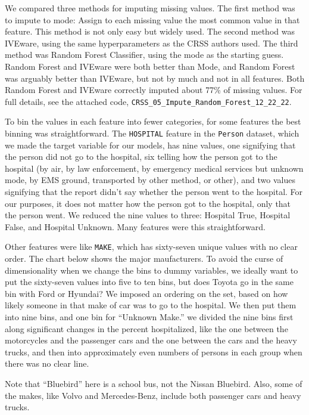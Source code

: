 We compared three methods for imputing missing values.  The first method was to impute to mode:  Assign to each missing value the most common value in that feature.  This method is not only easy but widely used.  The second method was IVEware, using the same hyperparameters as the CRSS authors used.  The third method was Random Forest Classifier, using the mode as the starting guess.  Random Forest and IVEware were both better than Mode, and Random Forest was arguably better than IVEware, but not by much and not in all features.  Both Random Forest and IVEware correctly imputed about 77\% of missing values.  For full details, see the attached code, 
\verb|CRSS_05_Impute_Random_Forest_12_22_22|.

To bin the values in each feature into fewer categories, for some features the best binning was straightforward.  The \verb|HOSPITAL| feature in the \verb|Person| dataset, which we made the target variable for our models, has nine values, one signifying that the person did not go to the hospital, six telling how the person got to the hospital (by air, by law enforcement, by emergency medical services but unknown mode, by EMS ground, transported by other method, or other), and two values signifying that the report didn't say whether the person went to the hospital.  For our purposes, it does not matter how the person got to the hospital, only that the person went.  We reduced the nine values to three:  Hospital True, Hospital False, and Hospital Unknown.  Many features were this straightforward.  

Other features were like \verb|MAKE|, which has sixty-seven unique values with no clear order.   The chart below shows the major maufacturers.  To avoid the curse of dimensionality when we change the bins to dummy variables, we ideally want to put the sixty-seven values into five to ten bins, but does Toyota go in the same bin with Ford or Hyundai?  We imposed an ordering on the set, based on how likely someone in that make of car was to go to the hospital.  We then put them into nine bins, and one bin for ``Unknown Make.''  we divided the nine bins first along significant changes in the percent hospitalized, like the one between the motorcycles and the passenger cars and the one between the cars and the heavy trucks, and then into approximately even numbers of persons in each group when there was no clear line.  

Note that ``Bluebird'' here is a school bus, not the Nissan Bluebird.  Also, some of the makes, like Volvo and Mercedes-Benz, include both passenger cars and heavy trucks.  

